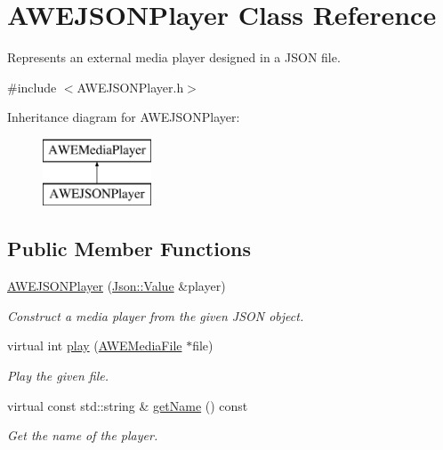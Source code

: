 \hypertarget{class_a_w_e_j_s_o_n_player}{\section{A\-W\-E\-J\-S\-O\-N\-Player Class Reference}
\label{class_a_w_e_j_s_o_n_player}
}


Represents an external media player designed in a J\-S\-O\-N file.  




{\ttfamily \#include $<$A\-W\-E\-J\-S\-O\-N\-Player.\-h$>$}

Inheritance diagram for A\-W\-E\-J\-S\-O\-N\-Player\-:\begin{figure}[H]
\begin{center}
\leavevmode
\includegraphics[height=2.000000cm]{class_a_w_e_j_s_o_n_player}
\end{center}
\end{figure}
\subsection*{Public Member Functions}
\begin{DoxyCompactItemize}
\item 
\hyperlink{class_a_w_e_j_s_o_n_player_a48ef17f3b80a231875785fae8b833bc2}{A\-W\-E\-J\-S\-O\-N\-Player} (\hyperlink{class_json_1_1_value}{Json\-::\-Value} \&player)
\begin{DoxyCompactList}\small\item\em Construct a media player from the given J\-S\-O\-N object. \end{DoxyCompactList}\item 
virtual int \hyperlink{class_a_w_e_j_s_o_n_player_ad0644f79fa7c565baff0a3c9ec4d73af}{play} (\hyperlink{class_a_w_e_media_file}{A\-W\-E\-Media\-File} $\ast$file)
\begin{DoxyCompactList}\small\item\em Play the given file. \end{DoxyCompactList}\item 
virtual const std\-::string \& \hyperlink{class_a_w_e_j_s_o_n_player_a26274c855d1579a95cb5efc0bc4d64c1}{get\-Name} () const 
\begin{DoxyCompactList}\small\item\em Get the name of the player. \end{DoxyCompactList}\end{DoxyCompactItemize}


